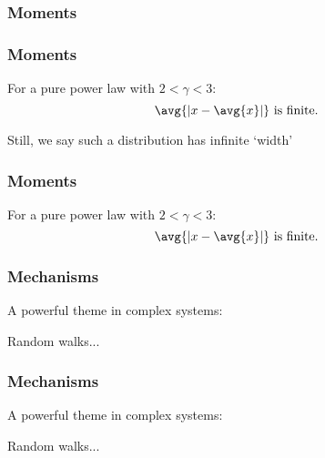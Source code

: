\begin{frame}
  \frametitle{Moments}






\end{frame}

\begin{frame}
  \frametitle{Moments}

For a pure power law with $2 < \gamma < 3$:
$$\avg{\left| x - \avg{x} \right|} \ \mbox{is finite.}$$

\inv

Still, we say such a distribution has infinite `width'

\end{frame}

\begin{frame}
  \frametitle{Moments}

For a pure power law with $2 < \gamma < 3$:
$$\avg{\left| x - \avg{x} \right|} \ \mbox{is finite.}$$





\end{frame}

\begin{frame}
  \frametitle{Mechanisms}

A powerful theme in complex systems: \\

\inv

 Random walks...

\end{frame}

\begin{frame}
  \frametitle{Mechanisms}

A powerful theme in complex systems: \\

 Random walks...

  
\end{frame}

